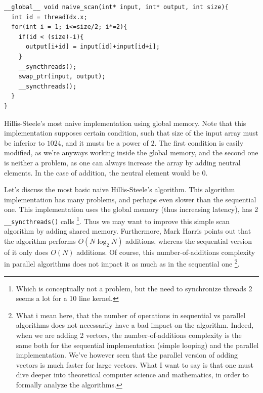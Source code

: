\begin{listing}
\begin{verbatim}
__global__ void naive_scan(int* input, int* output, int size){
  int id = threadIdx.x;
  for(int i = 1; i<=size/2; i*=2){
    if(id < (size)-i){
      output[i+id] = input[id]+input[id+i];
    }
    __syncthreads();
    swap_ptr(input, output);
    __syncthreads();
  }
}
\end{verbatim}
\label{listing:hillis_steele}
\caption{Hillis-Steele's most naive implementation using global memory. Note that this implementation 
supposes certain condition, such that size of the input array must be inferior to $1024$, and it musts be a power of $2$. 
The first condition is easily modified, as we're anyways working inside the global memory, and the second one is neither a problem, 
as one can always increase the array by adding neutral elements. In the case of addition, the neutral element would be 0.}
\end{listing}

Let's discuss the most basic naive Hillis-Steele's algorithm. This algorithm implementation 
has many problems, and perhaps even slower than the sequential one. 
This implementation uses the global memory (thus increasing latency), has 2 \verb|__syncthreads()| 
calls \footnote{Which is conceptually not a problem, but the need to synchronize threads 2 seems a lot for a 10 line kernel.}. 
Thus we may want to improve this simple scan algorithm by adding shared memory. 
Furthermore, Mark Harris points out that the algorithm performs 
$O(N\log_2N)$ additions, whereas the sequential version of it only does $O(N)$ additions. Of course, this 
number-of-additions complexity in parallel algorithms does not impact it as much as in the sequential one 
\footnote{What i mean here, that the number of operations in sequential vs parallel algorithms does not necessarily have a bad impact 
on the algorithm. Indeed, when we are adding 2 vectors, the number-of-additions complexity is the same both for the sequential implementation (simple looping) 
and the parallel implementation. We've however seen that the parallel version of adding vectors is much faster for large vectors. What I want to say 
is that one must dive deeper into theoretical computer science and mathematics, in order to formally analyze the algorithms.}.

